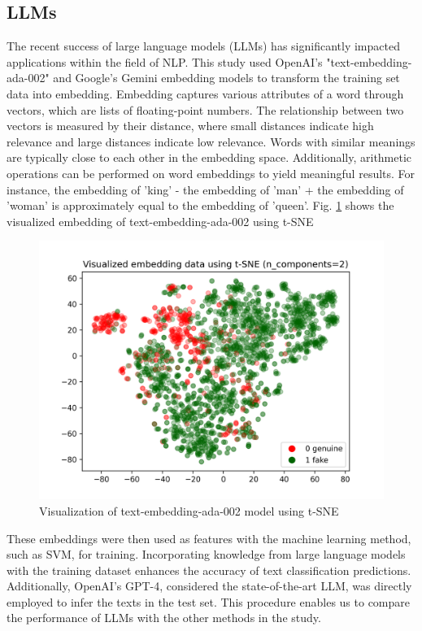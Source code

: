 \subsection{LLMs}
The recent success of large language models (LLMs) has significantly impacted applications within the field of NLP. This study used OpenAI's "text-embedding-ada-002"\cite{b26} and Google's Gemini embedding models\cite{b27} to transform the training set data into embedding. Embedding captures various attributes of a word through vectors, which are lists of floating-point numbers. The relationship between two vectors is measured by their distance, where small distances indicate high relevance and large distances indicate low relevance. Words with similar meanings are typically close to each other in the embedding space. Additionally, arithmetic operations can be performed on word embeddings to yield meaningful results. For instance, the embedding of 'king' - the embedding of 'man' + the embedding of 'woman' is approximately equal to the embedding of 'queen'. Fig. \ref{fig:ada_embedding} shows the visualized embedding of text-embedding-ada-002 using t-SNE\cite{b28}\\

\begin{figure}
    \centering
    \includegraphics[width=1\linewidth]{img/ada_embedding.png}
    \caption{Visualization of text-embedding-ada-002 model using t-SNE}
    \label{fig:ada_embedding}
\end{figure}

These embeddings were then used as features with the machine learning method, such as SVM, for training. Incorporating knowledge from large language models with the training dataset enhances the accuracy of text classification predictions.
Additionally, OpenAI's GPT-4\cite{b29}, considered the state-of-the-art LLM, was directly employed to infer the texts in the test set. This procedure enables us to compare the performance of LLMs with the other methods in the study.

